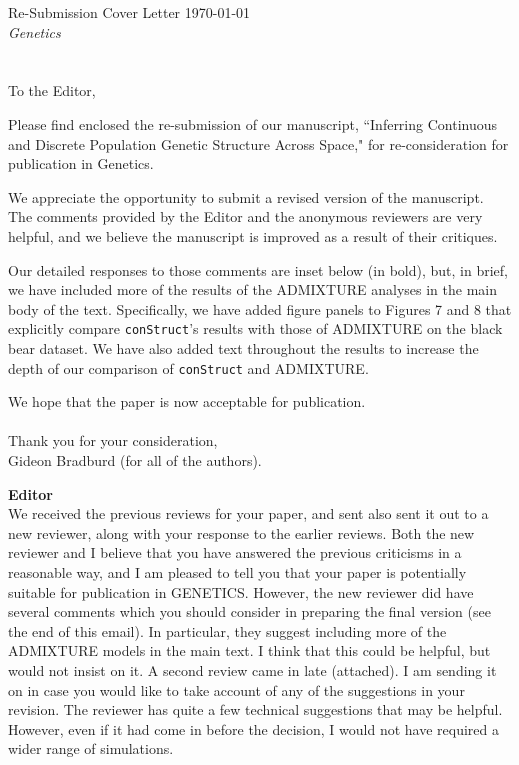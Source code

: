 \documentclass[11pt]{letter}
\begin{document}
Re-Submission Cover Letter \hfill	\today\\
\emph{Genetics}
\\\\\\
To the Editor,

Please find enclosed the re-submission of our manuscript, 
``Inferring Continuous and Discrete Population Genetic Structure Across Space,"
for re-consideration for publication in Genetics.

We appreciate the opportunity to submit a revised version of the manuscript.  
The comments provided by the Editor 
and the anonymous reviewers are very helpful, 
and we believe the manuscript is improved as a result 
of their critiques.

Our detailed responses to those comments are inset below (in bold), 
but, in brief, we have included more of the results of the ADMIXTURE analyses 
in the main body of the text.
Specifically, we have added figure panels to Figures 7 and 8 
that explicitly compare \texttt{conStruct}'s results with those of ADMIXTURE 
on the black bear dataset.
We have also added text throughout the results to increase the depth of 
our comparison of \texttt{conStruct} and ADMIXTURE.

We hope that the paper is now acceptable for publication.\\\\
%


Thank you for your consideration,\\
Gideon Bradburd (for all of the authors).

\newpage

\textbf{Editor}\\
We received the previous reviews for your paper, and sent also sent it out to a new reviewer, along with your response to the earlier reviews. Both the new reviewer and I believe that you have answered the previous criticisms in a reasonable way, and I am pleased to tell you that your paper is potentially suitable for publication in GENETICS. However, the new reviewer did have several comments which you should consider in preparing the final version (see the end of this email). In particular, they suggest including more of the ADMIXTURE models in the main text. I think that this could be helpful, but would not insist on it.  A second review came in late (attached).  I am sending it on in case you would like to take account of any of the suggestions in your revision. The reviewer has quite a few technical suggestions that may be helpful.  However, even if it had come in before the decision, I would not have required a wider range of simulations.
\end{document}
